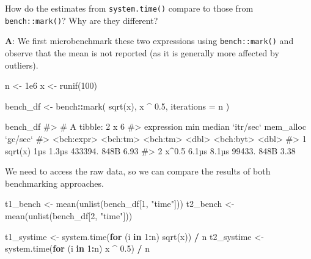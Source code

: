 \documentclass[
]{krantz}
\makeatletter
\newenvironment{Shaded}{\begin{snugshade}}{\end{snugshade}}
\newcommand{\CommentTok}[1]{\textcolor[rgb]{0.56,0.35,0.01}{\textit{#1}}}
\newcommand{\ControlFlowTok}[1]{\textcolor[rgb]{0.13,0.29,0.53}{\textbf{#1}}}
\newcommand{\DataTypeTok}[1]{\textcolor[rgb]{0.13,0.29,0.53}{#1}}
\newcommand{\DecValTok}[1]{\textcolor[rgb]{0.00,0.00,0.81}{#1}}
\newcommand{\FloatTok}[1]{\textcolor[rgb]{0.00,0.00,0.81}{#1}}
\newcommand{\KeywordTok}[1]{\textcolor[rgb]{0.13,0.29,0.53}{\textbf{#1}}}
\newcommand{\NormalTok}[1]{#1}
\newcommand{\OperatorTok}[1]{\textcolor[rgb]{0.81,0.36,0.00}{\textbf{#1}}}
\newcommand{\StringTok}[1]{\textcolor[rgb]{0.31,0.60,0.02}{#1}}
\newenvironment{kframe}{%
\medskip{}
\setlength{\fboxsep}{.8em}
 \def\at@end@of@kframe{}%
 \ifinner\ifhmode%
  \def\at@end@of@kframe{\end{minipage}}%
  \begin{minipage}{\columnwidth}%
 \fi\fi%
 \def\FrameCommand##1{\hskip\@totalleftmargin \hskip-\fboxsep
 \colorbox{shadecolor}{##1}\hskip-\fboxsep
     \hskip-\linewidth \hskip-\@totalleftmargin \hskip\columnwidth}%
 \MakeFramed {\advance\hsize-\width
   \@totalleftmargin\z@ \linewidth\hsize
   \@setminipage}}%
 {\par\unskip\endMakeFramed%
 \at@end@of@kframe}
\renewenvironment{Shaded}{\begin{kframe}}{\end{kframe}}
\renewcommand{\KeywordTok} [1]{\textcolor[rgb]{0.00,0.44,0.13}{{#1}}}
\renewcommand{\DataTypeTok}[1]{\textcolor[rgb]{0.56,0.13,0.00}{{#1}}}
\renewcommand{\DecValTok}  [1]{\textcolor[rgb]{0.25,0.63,0.44}{{#1}}}
\renewcommand{\FloatTok}   [1]{\textcolor[rgb]{0.25,0.63,0.44}{{#1}}}
\renewcommand{\StringTok}  [1]{\textcolor[rgb]{0.25,0.44,0.63}{{#1}}}
\renewcommand{\CommentTok} [1]{\textcolor[rgb]{0.38,0.63,0.69}{{#1}}}
\renewcommand{\NormalTok}  [1]{{#1}}
\makeatother
\begin{document}
How do the estimates from \texttt{system.time()} compare to those from \texttt{bench::mark()}? Why are they different?

\textbf{{A}}: We first microbenchmark these two expressions using \texttt{bench::mark()} and observe that the mean is not reported (as it is generally more affected by outliers).

\begin{Shaded}
\begin{Highlighting}[]
\NormalTok{n <-}\StringTok{ }\FloatTok{1e6}
\NormalTok{x <-}\StringTok{ }\KeywordTok{runif}\NormalTok{(}\DecValTok{100}\NormalTok{)}

\NormalTok{bench_df <-}\StringTok{ }\NormalTok{bench}\OperatorTok{::}\KeywordTok{mark}\NormalTok{(}
  \KeywordTok{sqrt}\NormalTok{(x), }
\NormalTok{  x }\OperatorTok{^}\StringTok{ }\FloatTok{0.5}\NormalTok{,}
  \DataTypeTok{iterations =}\NormalTok{ n}
\NormalTok{)}

\NormalTok{bench_df}
\CommentTok{#> # A tibble: 2 x 6}
\CommentTok{#>   expression      min   median `itr/sec` mem_alloc `gc/sec`}
\CommentTok{#>   <bch:expr> <bch:tm> <bch:tm>     <dbl> <bch:byt>    <dbl>}
\CommentTok{#> 1 sqrt(x)         1µs    1.3µs   433394.      848B     6.93}
\CommentTok{#> 2 x^0.5         6.1µs    8.1µs    99433.      848B     3.38}
\end{Highlighting}
\end{Shaded}

We need to access the raw data, so we can compare the results of both benchmarking approaches.

\begin{Shaded}
\begin{Highlighting}[]
\NormalTok{t1_bench <-}\StringTok{ }\KeywordTok{mean}\NormalTok{(}\KeywordTok{unlist}\NormalTok{(bench_df[}\DecValTok{1}\NormalTok{, }\StringTok{"time"}\NormalTok{]))}
\NormalTok{t2_bench <-}\StringTok{ }\KeywordTok{mean}\NormalTok{(}\KeywordTok{unlist}\NormalTok{(bench_df[}\DecValTok{2}\NormalTok{, }\StringTok{"time"}\NormalTok{]))}

\NormalTok{t1_systime <-}\StringTok{ }\KeywordTok{system.time}\NormalTok{(}\ControlFlowTok{for}\NormalTok{ (i }\ControlFlowTok{in} \DecValTok{1}\OperatorTok{:}\NormalTok{n) }\KeywordTok{sqrt}\NormalTok{(x)) }\OperatorTok{/}\StringTok{ }\NormalTok{n}
\NormalTok{t2_systime <-}\StringTok{ }\KeywordTok{system.time}\NormalTok{(}\ControlFlowTok{for}\NormalTok{ (i }\ControlFlowTok{in} \DecValTok{1}\OperatorTok{:}\NormalTok{n) x }\OperatorTok{^}\StringTok{ }\FloatTok{0.5}\NormalTok{) }\OperatorTok{/}\StringTok{ }\NormalTok{n}
\end{Highlighting}
\end{Shaded}
\end{document}
